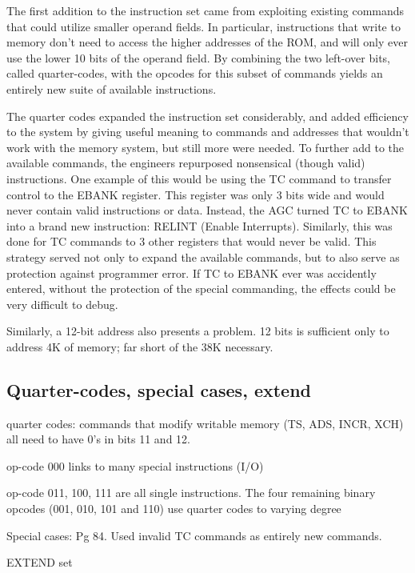 \documentclass[a4paper,11pt]{article}
\begin{document}
The first addition to the instruction set came from exploiting existing commands that could utilize smaller operand fields.  In particular, instructions that write to memory don't need to access the higher addresses of the ROM, and will only ever use the lower 10 bits of the operand field. By combining the two left-over bits, called quarter-codes, with the opcodes for this subset of commands yields an entirely new suite of available instructions.  

The quarter codes expanded the instruction set considerably, and added efficiency to the system by giving useful meaning to commands and addresses that wouldn't work with the memory system, but still more were needed.  To further add to the available commands, the engineers repurposed nonsensical (though valid) instructions.  One example of this would be using the TC command to transfer control to the EBANK register.  This register was only 3 bits wide and would never contain valid instructions or data.  Instead, the AGC turned TC to EBANK into a brand new instruction: RELINT (Enable Interrupts).  Similarly, this was done for TC commands to 3 other registers that would never be valid.  This strategy served not only to expand the available commands, but to also serve as protection against programmer error.  If TC to EBANK ever was accidently entered, without the protection of the special commanding, the effects could be very difficult to debug.

Similarly, a 12-bit address also presents a problem.  12 bits is sufficient only to address 4K of memory; far short of the 38K necessary. 

\subsection{Quarter-codes, special cases, extend}
quarter codes: commands that modify writable memory (TS, ADS, INCR, XCH) all need to have 0's in bits 11 and 12. 

op-code 000 links to many special instructions (I/O)

op-code 011, 100, 111 are all single instructions. 
The four remaining binary opcodes
(001, 010, 101 and 110) use quarter codes to varying degree

Special cases:  Pg 84.  Used invalid TC commands as entirely new commands.

EXTEND set
\end{document}

